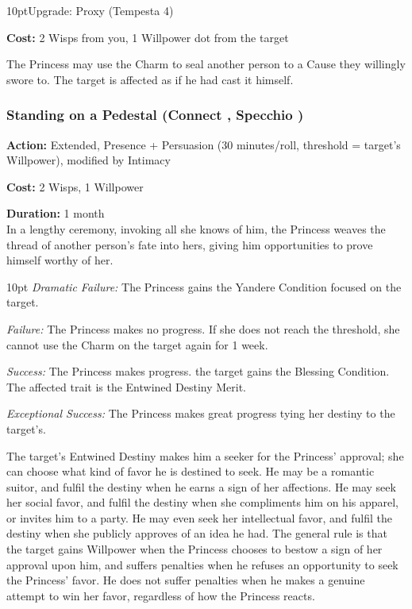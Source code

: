 \begin{myindentpar}{10pt}Upgrade: Proxy (Tempesta 4)

\noindent \textbf{Cost:} 2 Wisps from you, 1 Willpower dot from the target

The Princess may use the Charm to seal another person to a Cause they willingly swore to. The target is affected as if he had cast it himself.\end{myindentpar}

\subsubsection*{Standing on a Pedestal (Connect \textbullet\textbullet\textbullet\textbullet, Specchio \textbullet\textbullet\textbullet)}

\noindent \textbf{Action:} Extended, Presence + Persuasion (30 minutes/roll, threshold = target's Willpower), modified by Intimacy

\noindent \textbf{Cost:} 2 Wisps, 1 Willpower

\noindent \textbf{Duration:} 1 month \\

\noindent In a lengthy ceremony, invoking all she knows of him, the Princess weaves the thread of another person's fate into hers, giving him opportunities to prove himself worthy of her.

\begin{myindentpar}{10pt}        \emph{Dramatic Failure:} The Princess gains the Yandere Condition focused on the target.

        \emph{Failure:} The Princess makes no progress. If she does not reach the threshold, she cannot use the Charm on the target again for 1 week.

        \emph{Success:} The Princess makes progress. the target gains the Blessing Condition. The affected trait is the Entwined Destiny Merit.

        \emph{Exceptional Success:} The Princess makes great progress tying her destiny to the target's.\end{myindentpar}

The target's Entwined Destiny makes him a seeker for the Princess' approval; she can choose what kind of favor he is destined to seek. He may be a romantic suitor, and fulfil the destiny when he earns a sign of her affections. He may seek her social favor, and fulfil the destiny when she compliments him on his apparel, or invites him to a party. He may even seek her intellectual favor, and fulfil the destiny when she publicly approves of an idea he had. The general rule is that the target gains Willpower when the Princess chooses to bestow a sign of her approval upon him, and suffers penalties when he refuses an opportunity to seek the Princess' favor. He does not suffer penalties when he makes a genuine attempt to win her favor, regardless of how the Princess reacts.

